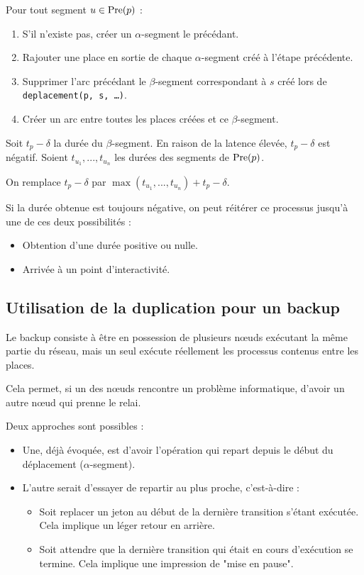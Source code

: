 Pour tout segment $u \in \operatorname{Pre}(p)$ : 
\begin{enumerate}
\item S'il n'existe pas, créer un $\alpha$-segment le précédant.
\item Rajouter une place en sortie de chaque $\alpha$-segment créé à l'étape précédente.
\item Supprimer l'arc précédant le $\beta$-segment correspondant à $s$ créé lors de \texttt{deplacement(p, s, \dots)}.
\item Créer un arc entre toutes les places créées et ce $\beta$-segment.
\end{enumerate}
Soit $t_p - \delta$ la durée du $\beta$-segment. En raison de la latence élevée, $t_p - \delta$ est négatif. Soient $t_{u_1}, ..., t_{u_n}$ les durées des segments de $\operatorname{Pre}(p)$.

On remplace $t_p - \delta$ par $\max(t_{u_1}, ..., t_{u_n}) + t_p - \delta$.

Si la durée obtenue est toujours négative, on peut réitérer ce processus jusqu'à une de ces deux possibilités : 

\begin{itemize}
\item Obtention d'une durée positive ou nulle.
\item Arrivée à un point d'interactivité.
\end{itemize}

\subsection{Utilisation de la duplication pour un backup}
Le backup consiste à être en possession de plusieurs nœuds exécutant la même partie du réseau, mais un seul exécute réellement les processus contenus entre les places.

Cela permet, si un des nœuds rencontre un problème informatique, d'avoir un autre nœud qui prenne le relai.

Deux approches sont possibles :
\begin{itemize}
\item Une, déjà évoquée, est d'avoir l'opération qui repart depuis le début du déplacement ($\alpha$-segment).
\item L'autre serait d'essayer de repartir au plus proche, c'est-à-dire :  
\begin{itemize}
\item Soit replacer un jeton au début de la dernière transition s'étant exécutée. Cela implique un léger retour en arrière.
\item Soit attendre que la dernière transition qui était en cours d'exécution se termine. Cela implique une impression de "mise en pause".
\end{itemize}
\end{itemize}

